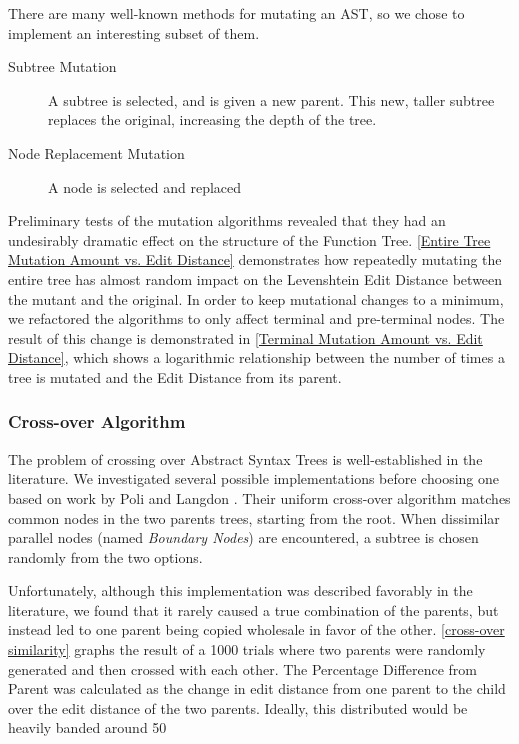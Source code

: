 \documentclass{acm_proc_article-sp}
\begin{document}
There are many well-known methods for mutating an AST, so we chose to implement an interesting subset of them. 
\begin{description}
    \item[Subtree Mutation] A subtree is selected, and is given a new parent. This new, taller subtree replaces the original, increasing the depth of the tree.\cite{genetic_programming}
    \item[Node Replacement Mutation] A node is selected and replaced
\end{description}
    Preliminary tests of the mutation algorithms revealed that they had an undesirably dramatic effect on the structure of the Function Tree. \ref{Entire Tree Mutation Amount vs. Edit Distance} demonstrates how repeatedly mutating the entire tree has almost random impact on the Levenshtein Edit Distance between the mutant and the original. In order to keep mutational changes to a minimum, we refactored the algorithms to only affect terminal and pre-terminal nodes. The result of this change is demonstrated in \ref{Terminal Mutation Amount vs. Edit Distance}, which shows a logarithmic relationship between the number of times a tree is mutated and the Edit Distance from its parent.
    
    \subsubsection{Cross-over Algorithm}
    
The problem of crossing over Abstract Syntax Trees is well-established in the literature. We investigated several possible implementations before choosing one based on work by Poli and Langdon \cite{crossover}. Their uniform cross-over algorithm matches common nodes in the two parents trees, starting from the root. When dissimilar parallel nodes (named \textit{Boundary Nodes}) are encountered, a subtree is chosen randomly from the two options. 

Unfortunately, although this implementation was described favorably in the literature, we found that it rarely caused a true combination of the parents, but instead led to one parent being copied wholesale in favor of the other. \ref{cross-over similarity} graphs the result of a 1000 trials where two parents were randomly generated and then crossed with each other. The Percentage Difference from Parent was calculated as the change in edit distance from one parent to the child over the edit distance of the two parents. Ideally, this distributed would be heavily banded around 50%
    
\end{document}
